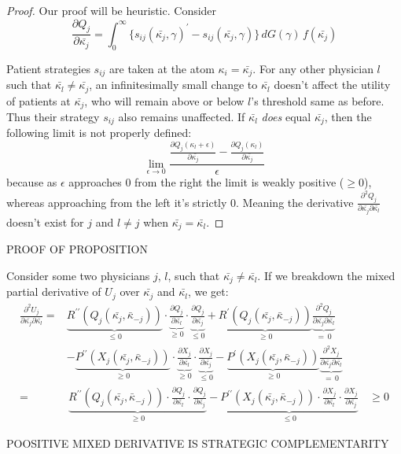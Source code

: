 \documentclass[../main.tex]{subfiles}
\begin{document}
\begin{proof}
Our proof will be heuristic. Consider
 \[
    \frac{\partial Q_{j}}{\partial\bar{\kappa_{j}}} = \int_{0}^{\infty} \{ {s_{ij}} (\bar{\kappa_j}, \gamma)^{\prime} - s_{ij} (\bar{\kappa_j}, \gamma)\} \,dG(\gamma) \,f(\bar{\kappa_j})
 \]

Patient strategies $s_{ij}$ are taken at the atom $\kappa_i = \bar{\kappa_j}$. For any other physician $l$ such that $\bar{\kappa_l} \neq \bar{\kappa_j}$, an infinitesimally small change to $\bar{\kappa_l}$ doesn't affect the utility of patients at $\bar{\kappa_j}$, who will remain above or below $l$'s threshold same as before. Thus their strategy $s_{ij}$ also remains unaffected. If $\bar{\kappa_l}$ \textit{does} equal $\bar{\kappa_j}$, then the following limit is not properly defined:
\[
    \lim_{\epsilon \rightarrow 0} \frac{ \frac{\partial Q_{j}(\kappa_l + \epsilon)}{\partial\bar{\kappa_{j}}} - \frac{\partial Q_{j}(\kappa_l ) }{\partial\bar{\kappa_{j}}}   }{\epsilon}
\]
because as $\epsilon$ approaches $0$ from the right the limit is weakly positive ($\geq 0$), whereas approaching from the left it's strictly $0$. Meaning the derivative $\frac{\partial^2 Q_{j}}{\partial\bar{\kappa_{j}} \partial\bar{\kappa_{l}}}$ doesn't exist for $j$ and $l \neq j$ when $\bar{\kappa_j}=\bar{\kappa_l}$.

\end{proof}

PROOF OF PROPOSITION

Consider some two physicians $j$, $l$, such that $\bar{\kappa_j} \neq \bar{\kappa_l}$. If we breakdown the mixed partial derivative of $U_j$ over $\bar{\kappa_j}$ and $\bar{\kappa_l}$, we get:
\begin{align*}
\frac{\partial^2 U_{j}}{\partial\bar{\kappa_{j}} \partial\bar{\kappa_{l}}} = & 
\underbrace{R^{\prime \prime}(Q_j(\bar{\kappa_j}, \bar{\kappa}_{-j}))}_{\leq 0}
\cdot \underbrace{\frac{\partial Q_{j}}{\partial\bar{\kappa_{l}}}}_{\geq 0}
\cdot \underbrace{\frac{\partial Q_{j}}{\partial\bar{\kappa_{j}}}}_{\leq 0}  + 
\underbrace{R^{\prime} (Q_j(\bar{\kappa_j}, \bar{\kappa}_{-j}))}_{\geq 0} \underbrace{\frac{\partial^2 Q_{j}}{{\partial\bar{\kappa_{j}} \partial\bar{\kappa_{l}}}}}_{= \, 0} & \\
 & - \underbrace{P^{\prime \prime} (X_j(\bar{\kappa_j}, \bar{\kappa}_{-j}))}_{\geq 0}
\cdot \underbrace{\frac{\partial X_{j}}{\partial\bar{\kappa_{l}}}}_{\geq 0}
\cdot \underbrace{\frac{\partial X_{j}}{\partial\bar{\kappa_{j}}}}_{\leq 0}  - 
\underbrace{P^{\prime} (X_j(\bar{\kappa_j}, \bar{\kappa}_{-j}))}_{\geq 0} \underbrace{\frac{\partial^2 X_{j}}{\partial\bar{\kappa_{j}} \partial\bar{\kappa_{l}}}}_{= \, 0} &  \\
    = & \, \underbrace{{R^{\prime \prime}} (Q_j(\bar{\kappa_j}, \bar{\kappa}_{-j}))
    \cdot \frac{\partial Q_{j}}{\partial\bar{\kappa_{l}}}
    \cdot \frac{\partial Q_{j}}{\partial\bar{\kappa_{j}}}}_{\geq 0}  -
    \underbrace{P^{\prime \prime} (X_j(\bar{\kappa_j}, \bar{\kappa}_{-j}))
    \cdot \frac{\partial X_{j}}{\partial\bar{\kappa_{l}}}
    \cdot \frac{\partial X_{j}}{\partial\bar{\kappa_{j}}}}_{\leq 0} \, & \geq 0
\end{align*}

POOSITIVE MIXED DERIVATIVE IS STRATEGIC COMPLEMENTARITY
\end{document}
